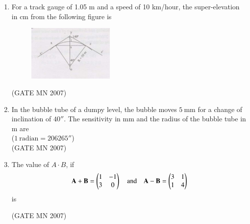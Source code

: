 \documentclass[journal]{IEEEtran}
\begin{document}
\begin{enumerate}
\item For a track gauge of 1.05 m and a speed of 10 km/hour, the super-elevation in cm from the following figure is
	\begin{figure}[H]
    \centering
	\includegraphics[width=0.4\textwidth]{Screenshot_2025_0812_180648.png}
	\caption{}
    \label{fig:Q65}
\end{figure}


\hfill (GATE MN 2007)
\begin{enumerate}
\end{enumerate}


\item In the bubble tube of a dumpy level, the bubble moves $5 \ \mathrm{mm}$ for a change of inclination of $40''$. The sensitivity in mm and the radius of the bubble tube in m are \\
($1 \ \mathrm{radian} = 206265''$) \\


\hfill (GATE MN 2007)
\begin{enumerate}
\end{enumerate}


\item The value of $A \cdot B$, if 
\[
\vec{A+B}=\myvec{1 & -1 \\ 3 & 0}
\quad \text{and} \quad
\vec{A-B}= \myvec{ 3 & 1 \\ 1 & 4 }
\]
is

\hfill (GATE MN 2007)
\begin{enumerate}
\end{enumerate}



\end{enumerate}
\end{document}
